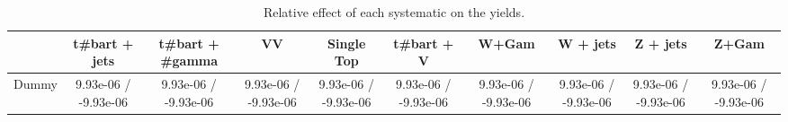 \begin{table}[htbp]
\begin{center}
\footnotesize
\begin{tabular}{|c|c|c|c|c|c|c|c|c|c|}
\hline 
      & t#bar{t} + jets      & t#bar{t} +  #gamma      & VV      & Single Top      & t#bar{t} + V      & W+Gam      & W + jets      & Z + jets      & Z+Gam \\ 
\hline 
  Dummy & 9.93e-06 / -9.93e-06 & 9.93e-06 / -9.93e-06 & 9.93e-06 / -9.93e-06 & 9.93e-06 / -9.93e-06 & 9.93e-06 / -9.93e-06 & 9.93e-06 / -9.93e-06 & 9.93e-06 / -9.93e-06 & 9.93e-06 / -9.93e-06 & 9.93e-06 / -9.93e-06 \\ 
\hline 
\end{tabular} 
\caption{Relative effect of each systematic on the yields.} 
\end{center} 
\end{table} 
